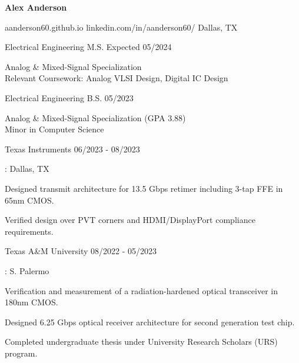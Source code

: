 \documentclass[11pt]{article}
\begin{document}
\centerline{{\Huge \bf Alex Anderson}}

\bigskip

        {aanderson60.github.io}
        {linkedin.com/in/aanderson60/}
        {Dallas, TX}


\begin{description}
\squish
{}
            {Electrical Engineering}
            {M.S. Expected 05/2024}

Analog \& Mixed-Signal Specialization \\
Relevant Coursework: Analog VLSI Design, Digital IC Design

            {Electrical Engineering}
            {B.S. 05/2023}

Analog \& Mixed-Signal Specialization (GPA 3.88)\\
Minor in Computer Science

\end{description}


\begin{description}
\squish
{}
            {Texas Instruments}
            {06/2023 - 08/2023}

\underline{}: Dallas, TX
            
\textbullet \space Designed transmit architecture for 13.5 Gbps retimer including 3-tap FFE in 65nm CMOS.

\textbullet \space Verified design over PVT corners and HDMI/DisplayPort compliance requirements.

        
\end{description}

\begin{description}
\squish
{}
            {Texas A\&M University}
            {08/2022 - 05/2023}

\underline{}: S. Palermo

\textbullet \space Verification and measurement of a radiation-hardened optical transceiver in 180nm CMOS.

\textbullet \space Designed 6.25 Gbps optical receiver architecture for second generation test chip.

\textbullet \space Completed undergraduate thesis under University Research Scholars (URS) program.


\end{description}
\end{document}

